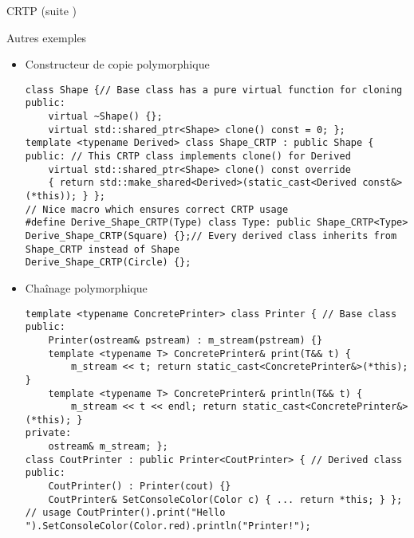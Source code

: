 \documentclass[handout,10pt]{beamer}
\begin{document}
\begin{frame}[fragile]{CRTP  (suite )}
\tiny
\begin{exampleblock}{Autres exemples}
\begin{itemize}
\item Constructeur de copie polymorphique
\begin{lstlisting}
class Shape {// Base class has a pure virtual function for cloning 
public: 
    virtual ~Shape() {}; 
    virtual std::shared_ptr<Shape> clone() const = 0; }; 
template <typename Derived> class Shape_CRTP : public Shape { 
public: // This CRTP class implements clone() for Derived 
    virtual std::shared_ptr<Shape> clone() const override 
    { return std::make_shared<Derived>(static_cast<Derived const&>(*this)); } }; 
// Nice macro which ensures correct CRTP usage 
#define Derive_Shape_CRTP(Type) class Type: public Shape_CRTP<Type> 
Derive_Shape_CRTP(Square) {};// Every derived class inherits from Shape_CRTP instead of Shape
Derive_Shape_CRTP(Circle) {};
\end{lstlisting}
\item Chaînage polymorphique
\begin{lstlisting}
template <typename ConcretePrinter> class Printer { // Base class 
public: 
    Printer(ostream& pstream) : m_stream(pstream) {} 
    template <typename T> ConcretePrinter& print(T&& t) { 
        m_stream << t; return static_cast<ConcretePrinter&>(*this); } 
    template <typename T> ConcretePrinter& println(T&& t) { 
        m_stream << t << endl; return static_cast<ConcretePrinter&>(*this); } 
private: 
    ostream& m_stream; }; 
class CoutPrinter : public Printer<CoutPrinter> { // Derived class 
public: 
    CoutPrinter() : Printer(cout) {} 
    CoutPrinter& SetConsoleColor(Color c) { ... return *this; } }; 
// usage CoutPrinter().print("Hello ").SetConsoleColor(Color.red).println("Printer!");
\end{lstlisting}
\end{itemize}
\end{exampleblock}
\end{frame}
\end{document}
